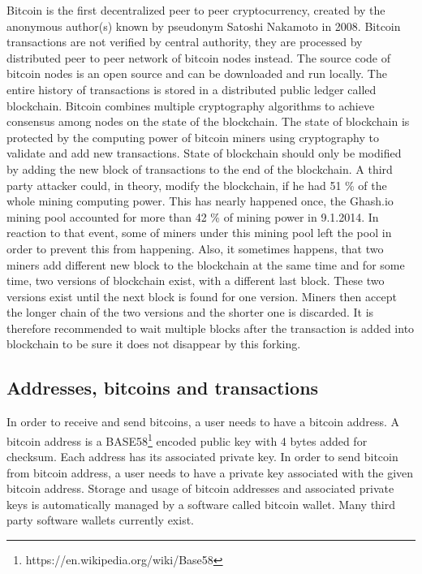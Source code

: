 \documentclass[
  digital, %
  table,   %
  lof,     %
  lot,     %
  oneside
]{fithesis3}
\begin{document}
Bitcoin \cite{nakamoto2008bitcoin} is the first decentralized peer to peer cryptocurrency,
created by the anonymous author(s) known by pseudonym Satoshi Nakamoto in 2008.
Bitcoin transactions are not verified by central authority, they are processed by distributed peer to peer network of bitcoin nodes instead. 
The source code of bitcoin nodes is an open source and can be downloaded and run locally. 
The entire history of transactions is stored in a distributed public ledger called blockchain.
Bitcoin combines multiple cryptography algorithms to achieve consensus among nodes
on the state of the blockchain.
The state of blockchain is protected by the computing power of bitcoin miners
using cryptography to validate and add new transactions.
State of blockchain should only be modified by adding the new block of transactions to the end of the blockchain.
A third party attacker could, in theory, modify the blockchain, if he had 51 \% of the whole mining computing power.
This has nearly happened once, the Ghash.io mining pool accounted for more than 42 \% of mining power in 9.1.2014. In reaction to that event, some of miners under this mining pool left the pool in order to prevent this from happening.
Also, it sometimes happens, that two miners add different new block to the blockchain at the same time
and for some time, two versions of blockchain exist, with a different last block.
These two versions exist until the next block is found for one version.
Miners then accept the longer chain of the two versions and the shorter one is discarded.
It is therefore recommended to wait multiple blocks after the transaction is added into blockchain
to be sure it does not disappear by this forking.
 
\subsection{Addresses, bitcoins and transactions}
\label{btcadd}
In order to receive and send bitcoins, a user needs to have a bitcoin address.
A bitcoin address is a BASE58\footnote{https://en.wikipedia.org/wiki/Base58}
encoded public key with 4 bytes added for checksum.
Each address has its associated private key.
In order to send bitcoin from bitcoin address,
a user needs to have a private key associated with the given bitcoin address.
Storage and usage of bitcoin addresses and associated private keys is automatically managed
by a software called bitcoin wallet. Many third party software wallets currently exist.
\end{document}
